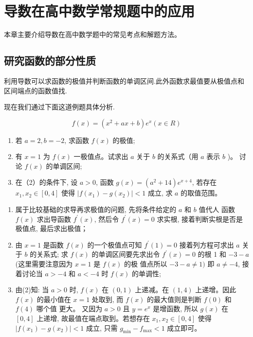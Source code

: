 \chapter{导数在高中数学常规题中的应用}

本章主要介绍导数在高中数学题中的常见考点和解题方法。

\section{研究函数的部分性质}

利用导数可以求函数的极值并判断函数的单调区间.此外函数求最值要从极值点和区间端点的函数值找.

现在我们通过下面这道例题具体分析.

\begin{example}
  \[
    f(x)=\left(x^{2}+a x+b\right) e^{x}(x \in R)
  \]
  \begin{enumerate}[(1)]
    \item 若 $a=2, b=-2$, 求函数 ${f}({x})$ 的极值;
    \item 有 $x=1$ 为 $f(x)$ 一极值点。试求出 $a$ 关于 $b$ 的关系式（用 $a$ 表示 $b$ )。 讨论 ${f}(x)$ 的单调区间;
    \item 在（2）的条件下, 设 ${a}>0$, 函数 $g(x)=\left(a^{2}+14\right) e^{x+4}$, 若存在 $x_{1}, x_{2} \in[0,4]$ 使得 $\left|f\left(x_{1}\right)-g\left(x_{2}\right)\right| < 1$ 成立, 求 ${a}$ 的取值范围。
  \end{enumerate}
\end{example}

\begin{analysis}
  \begin{enumerate}[(1)]
    \item 属于比较基础的求导再求极值的问题, 先将条件给定的 $a$ 和 $b$ 值代人 函数 ${f}({x})$ 求出导函数 ${f}^{\prime}({x})$, 然后令 ${f}^{\prime}({x})=0$ 求实根, 接着判断实根是否是极值点, 最后求出极值；
    \item 由 $x=1$ 是函数 ${f}({x})$ 的一个极值点可知 ${f}^{\prime}(1)=0$ 接着列方程可求出 ${a}$ 关于 ${b}$ 的关系式; 求 ${f}({x})$ 的单调区间要先求出令 $f^{\prime}(x)=0$ 的根 1 和 $-3-a$ (这里需要注意因为 $x=1$ 是 $f(x)$ 的极 值点所以 $-3-a \neq 1)$ 即 $a \neq-4$, 接着讨论当 $a>-4$ 和 $a<-4$ 时 $f(x)$ 的单调性;
    \item 由(2)知: 当 $a>0$ 时, $f(x)$ 在 $(0,1)$ 上递减。在 $(1,4)$ 上递增。因此 ${f}({x})$ 的最小值在 ${x}=1$ 处取到, 而 ${f}({x})$ 的最大值则是判断 ${f}(0)$ 和 ${f}(4)$ 哪个值 更大。 又因为 $a>0$ 且 $y=e^{x}$ 是增函数, 所以 $g(x)$ 在 $[0,4]$ 上递增, 故最值在端点取到。若想存在 $x_{1}, x_{2} \in[0,4]$ 使得 $\left|f\left(x_{1}\right)-g\left(x_{2}\right)\right| < 1$ 成立, 只需 ${g}_{\text {min}}-f_{\text {max}}<1$ 成立即可。
  \end{enumerate}
\end{analysis}


